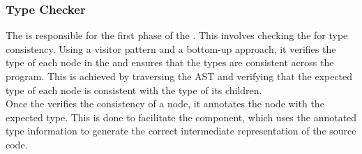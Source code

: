 \subsubsection{Type Checker}

The \typeChecker{} is responsible for the first phase of the \static. This involves
checking the \ast{} for type consistency. Using a visitor pattern and a bottom-up
approach, it verifies the type of each node in the \ast{} and ensures that the types
are consistent across the program. This is achieved by traversing the AST and
verifying that the expected type of each node is consistent with the type of its
children. \\

Once the \typeChecker{} verifies the consistency of a node, it annotates the node
with the expected type. This is done to facilitate the \codeGen{} component, which
uses the annotated type information to generate the correct intermediate
representation of the source code.


